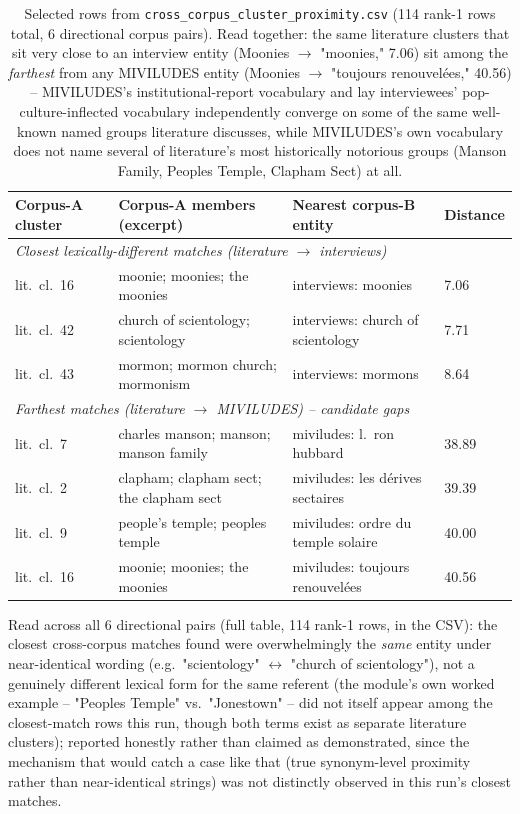 \documentclass[11pt,a4paper]{article}
\begin{document}
\begin{table}[h!]
\centering
\small
\begin{tabular}{p{2.6cm}p{4.2cm}p{2.3cm}p{1.5cm}}
\toprule
Corpus-A cluster & Corpus-A members (excerpt) & Nearest corpus-B entity & Distance \\
\midrule
\multicolumn{4}{l}{\textit{Closest lexically-different matches (literature $\to$ interviews)}} \\
lit.\ cl.\ 16 & moonie; moonies; the moonies & interviews: moonies & 7.06 \\
lit.\ cl.\ 42 & church of scientology; scientology & interviews: church of scientology & 7.71 \\
lit.\ cl.\ 43 & mormon; mormon church; mormonism & interviews: mormons & 8.64 \\
\multicolumn{4}{l}{\textit{Farthest matches (literature $\to$ MIVILUDES) -- candidate gaps}} \\
lit.\ cl.\ 7 & charles manson; manson; manson family & miviludes: l.\ ron hubbard & 38.89 \\
lit.\ cl.\ 2 & clapham; clapham sect; the clapham sect & miviludes: les d\'erives sectaires & 39.39 \\
lit.\ cl.\ 9 & people's temple; peoples temple & miviludes: ordre du temple solaire & 40.00 \\
lit.\ cl.\ 16 & moonie; moonies; the moonies & miviludes: toujours renouvel\'ees & 40.56 \\
\bottomrule
\end{tabular}
\caption{Selected rows from \texttt{cross\_corpus\_cluster\_proximity.csv}
(114 rank-1 rows total, 6 directional corpus pairs). Read together: the
same literature clusters that sit very close to an interview entity
(Moonies $\to$ "moonies," 7.06) sit among the \emph{farthest} from any
MIVILUDES entity (Moonies $\to$ "toujours renouvel\'ees," 40.56) --
MIVILUDES's institutional-report vocabulary and lay interviewees'
pop-culture-inflected vocabulary independently converge on some of the
same well-known named groups literature discusses, while MIVILUDES's own
vocabulary does not name several of literature's most historically
notorious groups (Manson Family, Peoples Temple, Clapham Sect) at all.}
\end{table}

Read across all 6 directional pairs (full table, 114 rank-1 rows, in the
CSV): the closest cross-corpus matches found were overwhelmingly the
\emph{same} entity under near-identical wording (e.g.\ "scientology"
$\leftrightarrow$ "church of scientology"), not a genuinely different
lexical form for the same referent (the module's own worked example --
"Peoples Temple" vs.\ "Jonestown" -- did not itself appear among the
closest-match rows this run, though both terms exist as separate
literature clusters); reported honestly rather than claimed as
demonstrated, since the mechanism that would catch a case like that
(true synonym-level proximity rather than near-identical strings) was
not distinctly observed in this run's closest matches.
\end{document}
